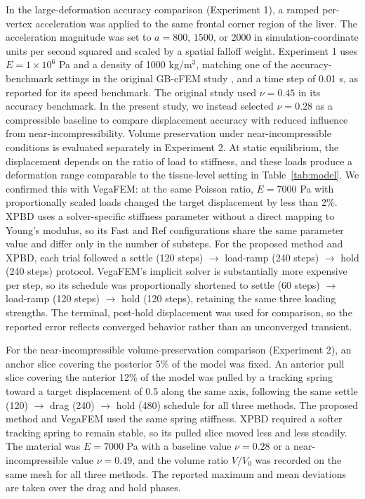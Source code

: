 \documentclass{ieeeaccess}
\begin{document}
In the large-deformation accuracy comparison (Experiment 1), a ramped per-vertex acceleration was applied to the same frontal corner region of the liver. The acceleration magnitude was set to $a=800$, $1500$, or $2000$ in simulation-coordinate units per second squared and scaled by a spatial falloff weight. Experiment 1 uses $E=1\times10^{6}$ Pa and a density of 1000 kg/m$^3$, matching one of the accuracy-benchmark settings in the original GB-cFEM study \cite{wang2025group}, and a time step of 0.01 s, as reported for its speed benchmark. The original study used $\nu=0.45$ in its accuracy benchmark. In the present study, we instead selected $\nu=0.28$ as a compressible baseline to compare displacement accuracy with reduced influence from near-incompressibility. Volume preservation under near-incompressible conditions is evaluated separately in Experiment 2. At static equilibrium, the displacement depends on the ratio of load to stiffness, and these loads produce a deformation range comparable to the tissue-level setting in Table~\ref{tab:model}. We confirmed this with VegaFEM: at the same Poisson ratio, $E=7000$ Pa with proportionally scaled loads changed the target displacement by less than 2\%. XPBD uses a solver-specific stiffness parameter without a direct mapping to Young's modulus, so its Fast and Ref configurations share the same parameter value and differ only in the number of substeps. For the proposed method and XPBD, each trial followed a settle (120 steps) $\rightarrow$ load-ramp (240 steps) $\rightarrow$ hold (240 steps) protocol. VegaFEM's implicit solver is substantially more expensive per step, so its schedule was proportionally shortened to settle (60 steps) $\rightarrow$ load-ramp (120 steps) $\rightarrow$ hold (120 steps), retaining the same three loading strengths. The terminal, post-hold displacement was used for comparison, so the reported error reflects converged behavior rather than an unconverged transient.

For the near-incompressible volume-preservation comparison (Experiment 2), an anchor slice covering the posterior 5\% of the model was fixed. An anterior pull slice covering the anterior 12\% of the model was pulled by a tracking spring toward a target displacement of 0.5 along the same axis, following the same settle (120) $\rightarrow$ drag (240) $\rightarrow$ hold (480) schedule for all three methods. The proposed method and VegaFEM used the same spring stiffness. XPBD required a softer tracking spring to remain stable, so its pulled slice moved less and less steadily. The material was $E=7000$ Pa with a baseline value $\nu=0.28$ or a near-incompressible value $\nu=0.49$, and the volume ratio $V/V_0$ was recorded on the same mesh for all three methods. The reported maximum and mean deviations are taken over the drag and hold phases.
\end{document}
